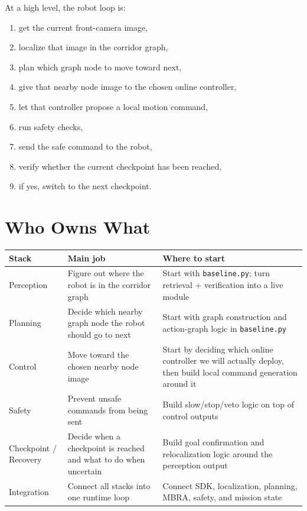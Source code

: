 \documentclass[11pt,a4paper]{article}
\begin{document}
At a high level, the robot loop is:

\begin{enumerate}[nosep]
  \item get the current front-camera image,
  \item localize that image in the corridor graph,
  \item plan which graph node to move toward next,
  \item give that nearby node image to the chosen online controller,
  \item let that controller propose a local motion command,
  \item run safety checks,
  \item send the safe command to the robot,
  \item verify whether the current checkpoint has been reached,
  \item if yes, switch to the next checkpoint.
\end{enumerate}


\section{Who Owns What}

\begin{tabularx}{\textwidth}{p{} p{} X}
\toprule
\textbf{Stack} & \textbf{Main job} & \textbf{Where to start} \\
\midrule
Perception & Figure out where the robot is in the corridor graph & Start with \texttt{baseline.py}; turn retrieval + verification into a live module \\
Planning & Decide which nearby graph node the robot should go to next & Start with graph construction and action-graph logic in \texttt{baseline.py} \\
Control & Move toward the chosen nearby node image & Start by deciding which online controller we will actually deploy, then build local command generation around it \\
Safety & Prevent unsafe commands from being sent & Build slow/stop/veto logic on top of control outputs \\
Checkpoint / Recovery & Decide when a checkpoint is reached and what to do when uncertain & Build goal confirmation and relocalization logic around the perception output \\
Integration & Connect all stacks into one runtime loop & Connect SDK, localization, planning, MBRA, safety, and mission state \\
\bottomrule
\end{tabularx}
\end{document}
